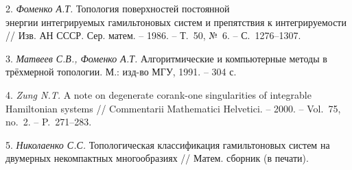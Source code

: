 2. {\it Фоменко А.Т.} Топология поверхностей постоянной\\ энергии интегрируемых гамильтоновых систем и препятствия к интегрируемости // Изв. АН СССР. Сер. матем. -- 1986. -- Т.~50, №~6. -- С.~1276--1307.

3. {\it Матвеев С.В., Фоменко А.Т.} Алгоритмические и компьютерные методы в трёхмерной топологии. М.: изд-во МГУ, 1991. -- 304 с.

4. {\it Zung N.T.} A note on degenerate corank-one singularities of integrable Hamiltonian systems // Commentarii Mathematici Helvetici. -- 2000. -- Vol.~75, no.~2. -- P.~271--283.

5. {\it Николаенко С.С.} Топологическая классификация гамильтоновых систем на двумерных некомпактных многообразиях // Матем. сборник (в печати).
